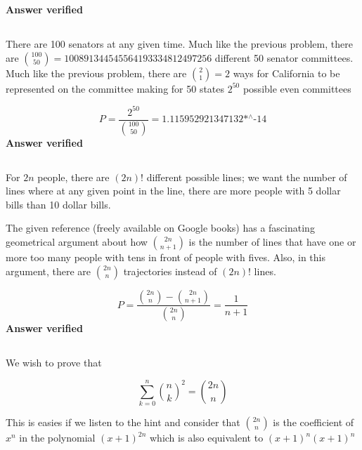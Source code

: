 \textbf{Answer verified}

\subsection{}
There are 100 senators at any given time.  Much like the previous problem, there are $\binom{100}{50}=100891344545564193334812497256$ different 50 senator committees.  Much like the previous problem, there are $\binom{2}{1}=2$ ways for California to be represented on the committee making for 50 states $2^{50}$ possible even committees

\begin{equation}
	P=\frac{2^{50}}{\binom{100}{50}} = \text{1.115952921347132$\grave{ }$*${}^{\wedge}$-14}
\label{answer1.15}
\end{equation}
\textbf{Answer verified}

\subsection{}
For $2n$ people, there are $(2n)!$ different possible lines; we want the number of lines where at any given point in the line, there are more people with 5 dollar bills than 10 dollar bills.

The given reference (freely available on Google books) has a fascinating geometrical argument about how $\binom{2n}{n+1}$ is the number of lines that have one or more too many people with tens in front of people with fives.  Also, in this argument, there are $\binom{2n}{n}$ trajectories instead of $(2n)!$ lines.

\begin{equation}
	P=\frac{\binom{2n}{n}-\binom{2n}{n+1}}{\binom{2n}{n}} = \frac{1}{n+1}
\label{answer1.16}
\end{equation}
\textbf{Answer verified}

\subsection{}
We wish to prove that

\begin{equation}
	\sum_{k=0}^{n} \binom{n}{k}^2 = \binom{2n}{n}
\label{answer1.17}
\end{equation}

This is easies if we listen to the hint and consider that $\binom{2n}{n}$ is the coefficient of $x^n$ in the polynomial $(x+1)^{2n}$ which is also equivalent to $(x+1)^n(x+1)^n$

